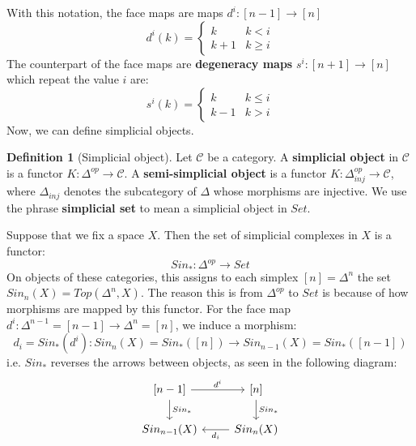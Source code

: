 \documentclass[11pt, oneside]{amsart}   	%
\theoremstyle{definition}
\newtheorem{definition}{Definition}[section]
\begin{document}
With this notation, the face maps are maps $d^i : [n - 1]\rightarrow [n]$
\begin{equation}
	d^i(k) = \begin{cases}
		k & k < i \\
		k + 1 & k\geq i
	\end{cases}
\end{equation}
The counterpart of the face maps are \textbf{degeneracy maps} $s^i : [n + 1]\rightarrow [n]$ which repeat the value $i$ are:
\begin{equation}
	s^i(k) = \begin{cases}
		k & k \leq i \\
		k - 1 & k > i
	\end{cases}
\end{equation}
Now, we can define simplicial objects.
\begin{definition}[Simplicial object]
	Let $\mathcal C$ be a category. A \textbf{simplicial object} in $\mathcal C$ is a functor $K : \Delta^{op}\rightarrow 
	\mathcal C$. A \textbf{semi-simplicial object} is a functor $K : \Delta_{inj}^{op}\rightarrow\mathcal C$, where 
	$\Delta_{inj}$ denotes the subcategory of $\Delta$ whose morphisms are injective. We use the phrase \textbf{simplicial 
	set} to mean a simplicial object in $Set$. 
\end{definition}

Suppose that we fix a space $X$. Then the set of simplicial complexes in $X$ is a functor:
\begin{equation}
	Sin_* : \Delta^{op}\rightarrow Set
\end{equation}
On objects of these categories, this assigns to each simplex $[n] = \Delta^n$ the set $Sin_n(X) = Top(\Delta^n, X)$. The 
reason this is from $\Delta^{op}$ to $Set$ is because of how morphisms are mapped by this functor. For the face map 
$d^i : \Delta^{n - 1} = [n - 1]\rightarrow \Delta^n = [n]$, we induce a morphism:
\begin{equation}
	d_i = Sin_*(d^i) : Sin_n(X) = Sin_*([n])\rightarrow Sin_{n - 1}(X) = Sin_*([n - 1])
\end{equation}
i.e. $Sin_*$ reverses the arrows between objects, as seen in the following diagram:
\[\begin{tikzcd}
\left[ n - 1\right]\arrow[r, "d^i"]\arrow[d, "Sin_*"] & \left[ n\right]\arrow[d, "Sin_*"] \\
Sin_{n - 1}(X) & Sin_n(X) \arrow[l, "d_i"] \\
\end{tikzcd}\]
\end{document}

